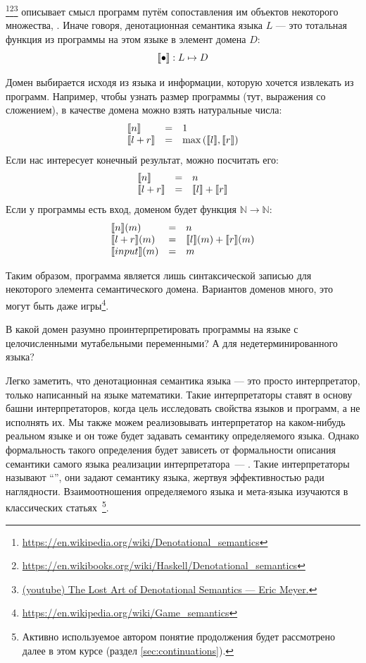 \footnote{\url{https://en.wikipedia.org/wiki/Denotational_semantics}}\footnote{\url{https://en.wikibooks.org/wiki/Haskell/Denotational_semantics}}\footnote{\href{https://youtu.be/pQyH0p-XJzE?si=TUEzrpHhJZfO7dTF}{(youtube) The Lost Art of Denotational Semantics --- Eric Meyer.}} описывает смысл программ путём сопоставления им объектов некоторого множества, .
Иначе говоря, денотационная семантика языка $L$ --- это тотальная функция из программы на этом языке в элемент домена $D$:
\[
    \llbracket{\bullet}\rrbracket : L \mapsto D
\]

Домен выбирается исходя из языка и информации, которую хочется извлекать из программ.
Например, чтобы узнать размер программы (тут, выражения со сложением), в качестве домена можно взять натуральные числа:
\[
    \begin{array}{lcl}
        \llbracket{n}\rrbracket & = & 1 \\
        \llbracket{l + r}\rrbracket & = & \max{(\llbracket{l}\rrbracket, \llbracket{r}\rrbracket)}
    \end{array}
\]
Если нас интересует конечный результат, можно посчитать его:
\[
    \begin{array}{lcl}
        \llbracket{n}\rrbracket & = & n \\
        \llbracket{l + r}\rrbracket & = & \llbracket{l}\rrbracket + \llbracket{r}\rrbracket
    \end{array}
\]
Если у программы есть вход, доменом будет функция $\mathbb{N}\to\mathbb{N}$:
\[
    \begin{array}{lcl}
        \llbracket{n}\rrbracket(m) & = & n \\
        \llbracket{l + r}\rrbracket(m) & = & \llbracket{l}\rrbracket(m) + \llbracket{r}\rrbracket(m) \\
        \llbracket{input}\rrbracket(m) & = & m
    \end{array}
\]

Таким образом, программа является лишь синтаксической записью для некоторого элемента семантического домена.
Вариантов доменов много, это могут быть даже игры\footnote{\url{https://en.wikipedia.org/wiki/Game_semantics}}. %

\begin{task}
    В какой домен разумно проинтерпретировать программы на языке с целочисленными мутабельными переменными?
    А для недетерминированного языка?
\end{task}

Легко заметить, что денотационная семантика языка --- это просто интерпретатор, только написанный на языке математики.
Такие интерпретаторы ставят в основу башни интерпретаторов, когда цель исследовать свойства языков и программ, а не исполнять их.
Мы также можем реализовывать интерпретатор на каком-нибудь реальном языке и он тоже будет задавать семантику определяемого языка.
Однако формальность такого определения будет зависеть от формальности описания семантики самого языка реализации интерпретатора~--- .
Такие интерпретаторы называют ``'', они задают семантику языка, жертвуя эффективностью ради наглядности.
Взаимоотношения определяемого языка и мета-языка изучаются в классических статьях~\cite{reynolds1972definitional,reynolds1998definitional}\footnote{Активно используемое автором понятие продолжения будет рассмотрено далее в этом курсе (раздел \ref{sec:continuations}).}.

